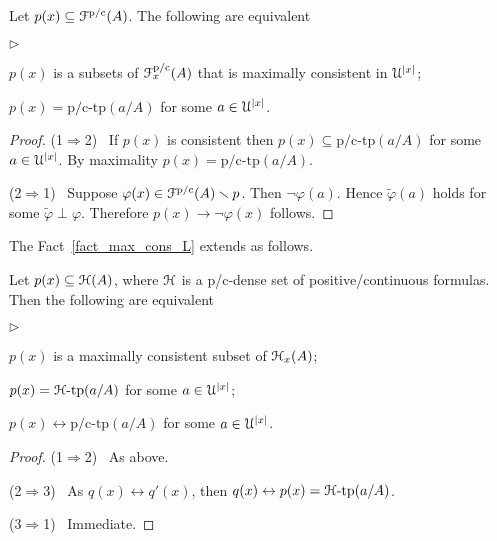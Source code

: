 \documentclass{amsproc}
\newcommand{\mylabel}[1]{{#1}\hfill}
\renewenvironment{itemize}
  {\begin{list}{$\triangleright$}{%
  \setlength{\parskip}{0mm}
  \setlength{\topsep}{.4\baselineskip}
  \setlength{\rightmargin}{0mm}
  \setlength{\listparindent}{0mm}
  \setlength{\itemindent}{0mm}
  \setlength{\labelwidth}{3ex}
  \setlength{\itemsep}{.2\baselineskip}
  \setlength{\parsep}{.2\baselineskip}
  \setlength{\partopsep}{0mm}
  \setlength{\labelsep}{1ex}
  \setlength{\leftmargin}{\labelwidth+\labelsep}
  \let\makelabel\mylabel}}{%
\end{list}}
\begin{document}
{\begin{fact}\label{fact_max_cons_L}
  Let $p(x)\subseteq{\EuScript F}^{\rm p/c}(A)$.
  The following are equivalent
  \begin{itemize}
    \item[1.] $p(x)$ is a subsets of ${\EuScript F}^{\rm p/c}_x(A)$ that is maximally consistent in ${\EuScript U}^{|x|}$;
    \item[2.] $p(x)=\mbox{p/c-tp}(a/A)$ for some $a\in{\EuScript U}^{|x|}$.
  \end{itemize}
\end{fact}

\begin{proof}
  (1$\Rightarrow$2) \ 
  If $p(x)$ is consistent then $p(x)\subseteq\mbox{p/c-tp}(a/A)$  for some $a\in{\EuScript U}^{|x|}$.
  By maximality $p(x)=\mbox{p/c-tp}(a/A)$.

  (2$\Rightarrow$1) \ 
  Suppose $\varphi(x)\in{\EuScript F}^{\rm p/c}(A)\smallsetminus  p$.
  Then $\neg\varphi(a)$.
  Hence $\tilde\varphi(a)$ holds for some $\tilde\varphi\perp\varphi$.
  Therefore $p(x)\rightarrow\neg\varphi(x)$ follows.
\end{proof}

The Fact~\ref{fact_max_cons_L} extends as follows.

\begin{fact}\label{fact_max_cons_F}
  Let $p(x)\subseteq{\EuScript H}(A)$, where ${\EuScript H}$ is a p/c-dense set of positive/continuous formulas.
  Then the following are equivalent 
  \begin{itemize}
    \item[1.] $p(x)$ is a maximally consistent subset of ${\EuScript H}_x(A)$;
    \item[2.] $p(x)={\EuScript H}\mbox{-tp}(a/A)$ for some $a\in{\EuScript U}^{|x|}$;
    \item[3.] $p(x)\leftrightarrow\mbox{p/c-tp}(a/A)$ for some $a\in{\EuScript U}^{|x|}$.
  \end{itemize}

\end{fact}
  
\begin{proof}
  (1$\Rightarrow$2) \ 
  As above.
  
  (2$\Rightarrow$3) \ 
  As $q(x)\leftrightarrow q'(x)$, then $q(x)\leftrightarrow p(x)={\EuScript H}\mbox{-tp}(a/A)$.

  (3$\Rightarrow$1) \ 
  Immediate.
\end{proof}

}
\end{document}
